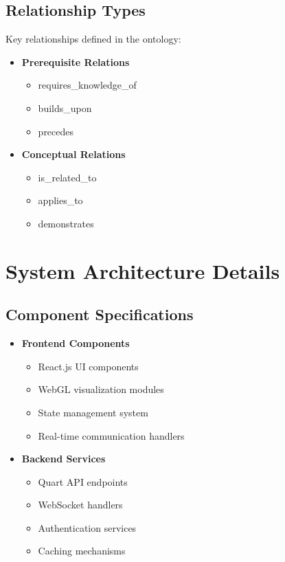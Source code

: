 \subsection{Relationship Types}
Key relationships defined in the ontology:

\begin{itemize}
    \item \textbf{Prerequisite Relations}
        \begin{itemize}
            \item requires\_knowledge\_of
            \item builds\_upon
            \item precedes
        \end{itemize}
    \item \textbf{Conceptual Relations}
        \begin{itemize}
            \item is\_related\_to
            \item applies\_to
            \item demonstrates
        \end{itemize}
\end{itemize}

\section{System Architecture Details}
\label{sec:system-architecture}

\subsection{Component Specifications}
\begin{itemize}
    \item \textbf{Frontend Components}
        \begin{itemize}
            \item React.js UI components
            \item WebGL visualization modules
            \item State management system
            \item Real-time communication handlers
        \end{itemize}
    
    \item \textbf{Backend Services}
        \begin{itemize}
            \item Quart API endpoints
            \item WebSocket handlers
            \item Authentication services
            \item Caching mechanisms
        \end{itemize}
\end{itemize}


